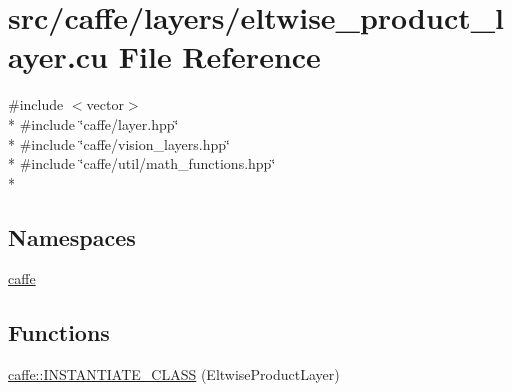 \hypertarget{eltwise__product__layer_8cu}{\section{src/caffe/layers/eltwise\+\_\+product\+\_\+layer.cu File Reference}
\label{eltwise__product__layer_8cu}
}
{\ttfamily \#include $<$vector$>$}\\*
{\ttfamily \#include \char`\"{}caffe/layer.\+hpp\char`\"{}}\\*
{\ttfamily \#include \char`\"{}caffe/vision\+\_\+layers.\+hpp\char`\"{}}\\*
{\ttfamily \#include \char`\"{}caffe/util/math\+\_\+functions.\+hpp\char`\"{}}\\*
\subsection*{Namespaces}
\begin{DoxyCompactItemize}
\item 
 \hyperlink{namespacecaffe}{caffe}
\end{DoxyCompactItemize}
\subsection*{Functions}
\begin{DoxyCompactItemize}
\item 
\hyperlink{namespacecaffe_a33dd23ad16f92585675043343bf63b8c}{caffe\+::\+I\+N\+S\+T\+A\+N\+T\+I\+A\+T\+E\+\_\+\+C\+L\+A\+S\+S} (Eltwise\+Product\+Layer)
\end{DoxyCompactItemize}
